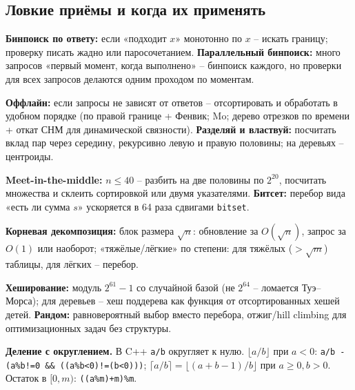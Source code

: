 \subsection{Ловкие приёмы и когда их применять}
\textbf{Бинпоиск по ответу:} если «подходит $x$» монотонно по $x$ -- искать границу; проверку писать жадно или паросочетанием. \textbf{Параллельный бинпоиск:} много запросов «первый момент, когда выполнено» -- бинпоиск каждого, но проверки для всех запросов делаются одним проходом по моментам.
\par \textbf{Оффлайн:} если запросы не зависят от ответов -- отсортировать и обработать в удобном порядке (по правой границе + Фенвик; Mo; дерево отрезков по времени + откат СНМ для динамической связности). \textbf{Разделяй и властвуй:} посчитать вклад пар через середину, рекурсивно левую и правую половины; на деревьях -- центроиды.
\par \textbf{Meet-in-the-middle:} $n\le40$ -- разбить на две половины по $2^{20}$, посчитать множества и склеить сортировкой или двумя указателями. \textbf{Битсет:} перебор вида «есть ли сумма $s$» ускоряется в 64 раза сдвигами \texttt{bitset}.
\par \textbf{Корневая декомпозиция:} блок размера $\sqrt n$: обновление за $O(\sqrt n)$, запрос за $O(1)$ или наоборот; «тяжёлые/лёгкие» по степени: для тяжёлых ($>\sqrt m$) таблицы, для лёгких -- перебор.
\par \textbf{Хеширование:} модуль $2^{61}-1$ со случайной базой (не $2^{64}$ -- ломается Туэ--Морса); для деревьев -- хеш поддерева как функция от отсортированных хешей детей. \textbf{Рандом:} равновероятный выбор вместо перебора, отжиг/hill climbing для оптимизационных задач без структуры.
\par \textbf{Деление с округлением.} В C++ \texttt{a/b} округляет к нулю. $\lfloor a/b\rfloor$ при $a<0$: \texttt{a/b - (a\%b!=0 \&\& ((a\%b<0)!=(b<0)))}; $\lceil a/b\rceil=\lfloor(a+b-1)/b\rfloor$ при $a\ge0,b>0$. Остаток в $[0,m)$: \texttt{((a\%m)+m)\%m}.
